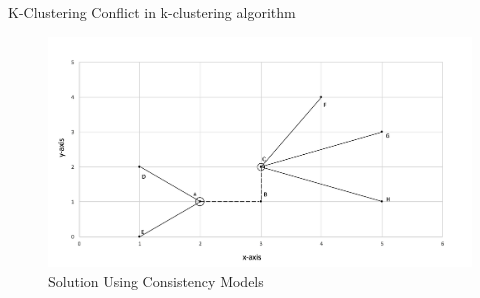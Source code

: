 \begin{frame}{K-Clustering}
	Conflict in k-clustering algorithm
			\begin{figure}
			\includegraphics[width=0.8\linewidth]{figures/kcluster2.jpg}
			\caption{Solution Using Consistency Models}
			\end{figure}
\end{frame}
